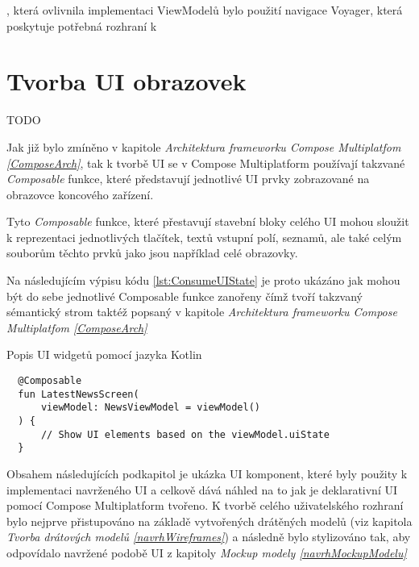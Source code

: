 , která ovlivnila implementaci ViewModelů bylo použití navigace Voyager, která poskytuje potřebná rozhraní k 



\section{Tvorba UI obrazovek}
TODO %

Jak již bylo zmíněno v kapitole \textit{Architektura frameworku Compose Multiplatfom \ref{ComposeArch}}, tak k tvorbě UI se v Compose Multiplatform 
používají takzvané \textit{Composable} funkce, které představují jednotlivé UI prvky zobrazované na obrazovce koncového zařízení. 

Tyto \textit{Composable} funkce, které přestavují stavební bloky celého UI mohou sloužit k reprezentaci jednotlivých tlačítek, textů vstupní polí, 
seznamů, ale také celým souborům těchto prvků jako jsou například celé obrazovky.

Na následujícím výpisu kódu \ref{lst:ConsumeUIState} je proto ukázáno jak mohou být do sebe jednotlivé Composable funkce zanořeny čímž tvoří
takzvaný sémantický strom taktéž popsaný v kapitole \textit{Architektura frameworku Compose Multiplatfom \ref{ComposeArch}}

\begin{listing}[H]
\caption{Popis UI widgetů pomocí jazyka Kotlin}\label{lst:ConsumeUIState}
\begin{verbatim}
  @Composable
  fun LatestNewsScreen(
      viewModel: NewsViewModel = viewModel()
  ) {
      // Show UI elements based on the viewModel.uiState
  }
\end{verbatim}
\end{listing}



\bigskip

Obsahem následujících podkapitol je ukázka UI komponent, které byly použity k implementaci navrženého UI a celkově dává náhled na to
jak je deklarativní UI pomocí Compose Multiplatform tvořeno. K tvorbě celého uživatelského rozhraní bylo nejprve přistupováno na základě vytvořených 
drátěných modelů (viz kapitola \textit{Tvorba drátových modelů \ref{navrhWireframes}}) a následně bylo stylizováno tak, aby odpovídalo navržené podobě UI z kapitoly \textit{Mockup modely \ref{navrhMockupModelu}}

